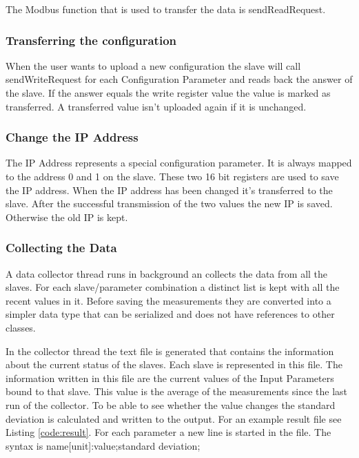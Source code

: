 The Modbus function that is used to transfer the data is sendReadRequest.

\subsubsection{Transferring the configuration} %
\label{ssub:transferring_the_configuration}
When the user wants to upload a new configuration the slave will call sendWriteRequest for each Configuration Parameter and reads back the answer of the slave. If the answer equals the write register value the value is marked as transferred. A transferred value isn't uploaded again if it is unchanged.
\subsubsection{Change the IP Address} %
\label{ssub:change_the_ip_address}
The IP Address represents a special configuration parameter. It is always mapped to the address 0 and 1 on the slave. These two 16 bit registers are used to save the IP address. When the IP address has been changed it's transferred to the slave. After the successful transmission of the two values the new IP is saved. Otherwise the old IP is kept.


\subsubsection{Collecting the Data} %
\label{ssub:collecting_the_data}
A data collector thread runs in background an collects the data from all the slaves. For each slave/parameter combination a distinct list is kept with all the recent values in it. Before saving the measurements they are converted into a simpler data type that can be serialized and does not have references to other classes.

In the collector thread the text file is generated that contains the information about the current status of the slaves. Each slave is represented in this file. The information written in this file are the current values of the Input Parameters bound to that slave. This value is the average of the measurements since the last run of the collector. To be able to see whether the value changes the standard deviation is calculated and written to the output. For an example result file see Listing \ref{code:result}. 
For each parameter a new line is started in the file. The syntax is {\C name[unit]:value;standard deviation;}


